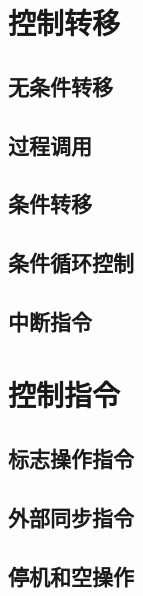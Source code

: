 \section{控制转移}
\subsection{无条件转移}
\subsection{过程调用}
\subsection{条件转移}
\subsection{条件循环控制}
\subsection{中断指令}
\section{控制指令}
\subsection{标志操作指令}
\subsection{外部同步指令}
\subsection{停机和空操作}